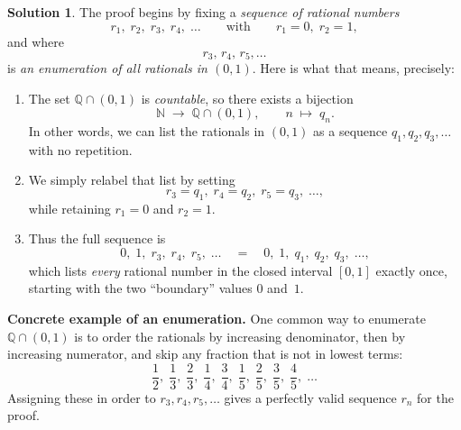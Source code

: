 \documentclass[12pt]{article}
\theoremstyle{definition} %
\newtheorem{solution}{Solution}
\theoremstyle{plain} %
\begin{document}
  \begin{solution}
    The proof begins by fixing a \emph{sequence of rational numbers}
    \[
      r_{1},\; r_{2},\; r_{3},\; r_{4},\;\dotsc
      \qquad\text{with}\qquad
      r_{1}=0,\; r_{2}=1,
    \]
    and where
    \[
      r_{3},\,r_{4},\,r_{5},\dotsc
    \]
    is \emph{an enumeration of all rationals in $(0,1)$}.  
    Here is what that means, precisely:
    
    \begin{enumerate}
        \item The set $\mathbb{Q}\cap(0,1)$ is \emph{countable}, so there exists a bijection
              \[
                 \mathbb{N}\;\longrightarrow\;\mathbb{Q}\cap(0,1),\qquad 
                 n\;\longmapsto\; q_{n}.
              \]
              In other words, we can list the rationals in $(0,1)$ as a sequence
              $q_{1},q_{2},q_{3},\dotsc$ with no repetition.
    
        \item We simply relabel that list by setting
              \[
                r_{3}=q_{1},\; r_{4}=q_{2},\; r_{5}=q_{3},\;\dotsc,
              \]
              while retaining $r_{1}=0$ and $r_{2}=1$.
    
        \item Thus the full sequence is
              \[
                0,\; 1,\; r_{3},\; r_{4},\; r_{5},\;\dotsc
                \quad=\quad
                0,\; 1,\; q_{1},\; q_{2},\; q_{3},\;\dotsc,
              \]
              which lists \emph{every} rational number in the closed interval
              $[0,1]$ exactly once, starting with the two ``boundary'' values
              $0$ and~$1$.
    \end{enumerate}
    
    \medskip
    \noindent
    \textbf{Concrete example of an enumeration.}  
    One common way to enumerate $\mathbb{Q}\cap(0,1)$ is to order
    the rationals by increasing denominator, then by increasing numerator, and
    skip any fraction that is not in lowest terms:
    \[
      \frac{1}{2},\;
      \frac{1}{3},\;
      \frac{2}{3},\;
      \frac{1}{4},\;
      \frac{3}{4},\;
      \frac{1}{5},\;
      \frac{2}{5},\;
      \frac{3}{5},\;
      \frac{4}{5},\;\dotsc
    \]
    Assigning these in order to $r_{3},r_{4},r_{5},\dotsc$ gives a perfectly
    valid sequence $r_{n}$ for the proof.
    
    \end{solution}
    \pagebreak
\end{document}
